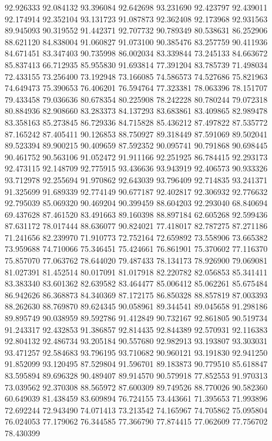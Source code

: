 92.926333
92.084132
93.396084
92.642698
93.231690
92.423797
92.439011
92.174914
92.352104
93.131723
91.087873
92.362408
92.173968
92.931563
89.945093
90.319552
91.442371
92.707732
90.789349
80.538631
86.252906
88.621120
84.838004
91.060827
91.073100
90.385476
83.257759
90.411936
84.671451
83.347403
90.735998
86.002034
83.339844
73.245133
84.663672
85.837413
66.712935
85.955830
91.693814
77.391204
83.785739
71.498034
72.433155
73.256400
73.192948
73.166085
74.586573
74.527686
75.821963
74.649473
75.390653
76.406201
76.594764
77.323381
78.063396
78.151707
79.433458
79.036636
80.678354
80.225908
78.242228
80.780244
79.072318
80.884936
82.908660
83.283373
84.137293
83.683861
83.409865
82.989478
83.358163
85.273845
86.729336
84.715828
85.436212
87.497822
87.535772
87.165242
87.405411
90.126853
88.750927
89.318449
87.591069
89.502041
89.523394
89.900215
90.409659
87.592352
90.095741
90.791868
90.698445
90.461752
90.563106
91.052472
91.911166
92.251925
86.784415
92.293173
92.473115
92.148709
92.775915
93.436636
93.943919
92.406573
90.933326
93.712978
92.255694
91.970862
92.643039
93.796409
92.714835
93.241371
91.325699
91.689339
92.774149
90.677187
92.402817
92.306932
92.776632
92.795039
85.069320
90.469204
90.399459
88.604203
92.293040
68.840694
69.437628
87.461520
83.491663
89.160398
88.897184
62.605268
92.599436
87.631172
78.017444
88.636077
90.824021
77.418017
82.787275
87.271186
71.241656
82.239970
71.910773
72.752164
72.659892
73.558906
73.665382
73.959688
74.710066
75.346451
75.424661
76.861901
75.370602
77.116370
75.857070
77.063762
78.644020
79.487433
78.134173
78.926900
79.069081
81.027391
81.452514
80.017091
81.017918
82.220782
82.056853
85.341411
83.383340
83.601362
82.639582
83.464477
85.006412
85.062261
85.675484
86.942626
86.368873
84.340369
87.172175
86.850328
88.857819
87.003393
88.262630
88.769870
89.624345
90.058961
89.344541
89.045658
91.298186
89.895749
90.038959
89.592786
91.412849
90.732167
92.861805
90.519734
91.243317
92.432853
91.386857
92.814435
92.844389
92.570931
92.116383
92.804132
92.486734
93.205184
90.557680
92.982913
93.193807
93.303031
93.471257
92.584683
93.796195
93.710682
90.960121
93.191830
92.941250
91.852099
93.120495
87.529804
91.596701
89.183873
90.779510
85.618847
83.595894
89.696328
90.489407
89.914570
90.579918
77.852553
91.970313
73.039562
92.370308
88.565972
87.600309
89.749526
88.770026
90.582360
60.649039
81.438459
83.609894
76.724155
73.443661
71.395653
71.993896
72.692244
72.943490
74.071413
73.213542
74.165967
74.705862
75.095804
76.024053
77.179062
76.344585
77.366790
77.874415
77.062609
77.756702
78.430399
